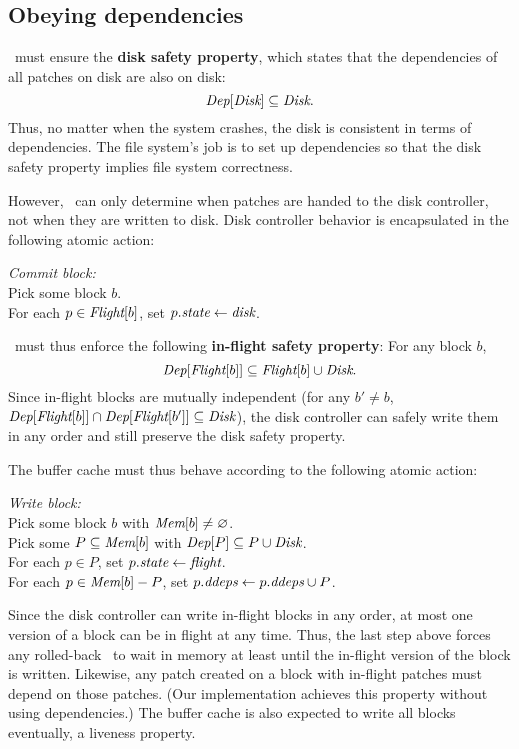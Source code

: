 \subsection{Obeying dependencies}
\label{sec:patch:dependencies}

\Kudos\ must ensure the \textbf{disk safety property}, which states that
 the dependencies of all patches on disk are also on disk:
%
\[ \PDepset{\PDisk} \subseteq \PDisk. \]
%
Thus, no matter when the system crashes, the disk is consistent in terms of
dependencies.
%
The file system's job is to set up dependencies so that the disk safety
property implies file system correctness.

However, \Kudos\ can only determine when patches are handed to the disk
 controller, not when they are written to disk.
%
Disk controller behavior is encapsulated in the following atomic action:

\begin{tabbing}
\textit{Commit block:} \\
\quad Pick some block $b$. \\
\quad For each $p \in \PInf[b]$, set $p.\textit{state} \gets \textit{disk}$.
\end{tabbing}

\noindent
%
\Kudos\ must thus enforce the following \textbf{in-flight
 safety property}: For any block $b$,
%
\[ \PDepset{\PInf[b]} \subseteq \PInf[b] \cup \PDisk . \]
%
Since in-flight blocks are mutually independent (for any $b' \neq b$,
 $\PDepset{\PInf[b]} \cap \PDepset{\PInf[b']} \subseteq \PDisk$), the disk
 controller can safely write them in any order and still preserve the disk
 safety property.


The buffer cache must thus behave according to the following atomic action:

\begin{tabbing}
\textit{Write block:} \\
\quad Pick some block $b$ with $\PMem[b] \neq \emptyset$. \\
\quad Pick some $P \subseteq \PMem[b]$ with $\PDepset{P} \subseteq P \cup
\PDisk$. \\
\quad For each $p \in P$, set $p.\textit{state} \gets \textit{flight}$. \\
\quad For each $p \in \PMem[b]-P$, set $\PDDepset{p} \gets \PDDepset{p}
\cup P$.
\end{tabbing}

\noindent
%
Since the disk controller can write in-flight blocks in any order, at most
one version of a block can be in flight at any time.
%
Thus, the last step above forces any rolled-back \patches\ to wait in
memory at least until the in-flight version of the block is written.
%
Likewise, any patch created on a block with in-flight patches must depend
on those patches.
%
(Our implementation achieves this property without using dependencies.)
%
The buffer cache is also expected to write all blocks eventually, a
 liveness property.


